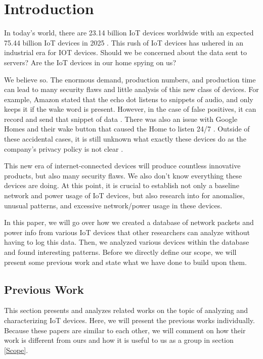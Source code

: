 \chapter{Introduction}
\label{Introduction}
In today's world, there are 23.14 billion IoT devices worldwide with an expected 75.44 billion IoT devices in 2025 \cite{statista_2016}. This rush of IoT devices has ushered in an industrial era for IOT devices. Should we be concerned about the data sent to servers? Are the IoT devices in our home spying on us?

We believe so. The enormous demand, production numbers, and production time can lead to many security flaws and little analysis of this new class of devices. For example, Amazon stated that the echo dot listens to snippets of audio, and only keeps it if the wake word is present. However, in the case of false positives, it can record and send that snippet of data \cite{kruzel_2018}. There was also an issue with Google Homes and their wake button that caused the Home to listen 24/7 \cite{burke_2017}. Outside of these accidental cases, it is still unknown what exactly these devices do as the company's privacy policy is not clear \cite{kruzel_2018}.

This new era of internet-connected devices will produce countless innovative products, but also many security flaws. We also don't know everything these devices are doing. At this point, it is crucial to establish not only a baseline network and power usage of IoT devices, but also research into for anomalies, unusual patterns, and excessive network/power usage in these devices.

In this paper, we will go over how we created a database of network packets and power info from various IoT devices that other researchers can analyze without having to log this data. Then, we analyzed various devices within the database and found interesting patterns. Before we directly define our scope, we will present some previous work and state what we have done to build upon them.

\section{Previous Work}
This section presents and analyzes related works on the topic of analyzing and characterizing IoT devices. Here, we will present the previous works individually. Because these papers are similar to each other, we will comment on how their work is different from ours and how it is useful to us as a group in section \ref{Scope}.

